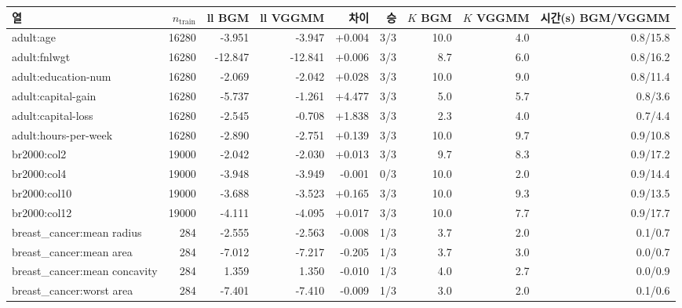 \begin{tabular}{lrrrrrrrr}
\toprule
열 & $n_{\mathrm{train}}$ & ll BGM & ll VGGMM & 차이 & 승 & $K$ BGM & $K$ VGGMM & 시간(s) BGM/VGGMM \\
\midrule
adult:age & 16280 & -3.951 & -3.947 & +0.004 & 3/3 & 10.0 & 4.0 & 0.8/15.8 \\
adult:fnlwgt & 16280 & -12.847 & -12.841 & +0.006 & 3/3 & 8.7 & 6.0 & 0.8/16.2 \\
adult:education-num & 16280 & -2.069 & -2.042 & +0.028 & 3/3 & 10.0 & 9.0 & 0.8/11.4 \\
adult:capital-gain & 16280 & -5.737 & -1.261 & +4.477 & 3/3 & 5.0 & 5.7 & 0.8/3.6 \\
adult:capital-loss & 16280 & -2.545 & -0.708 & +1.838 & 3/3 & 2.3 & 4.0 & 0.7/4.4 \\
adult:hours-per-week & 16280 & -2.890 & -2.751 & +0.139 & 3/3 & 10.0 & 9.7 & 0.9/10.8 \\
br2000:col2 & 19000 & -2.042 & -2.030 & +0.013 & 3/3 & 9.7 & 8.3 & 0.9/17.2 \\
br2000:col4 & 19000 & -3.948 & -3.949 & -0.001 & 0/3 & 10.0 & 2.0 & 0.9/14.4 \\
br2000:col10 & 19000 & -3.688 & -3.523 & +0.165 & 3/3 & 10.0 & 9.3 & 0.9/13.5 \\
br2000:col12 & 19000 & -4.111 & -4.095 & +0.017 & 3/3 & 10.0 & 7.7 & 0.9/17.7 \\
breast\_cancer:mean radius & 284 & -2.555 & -2.563 & -0.008 & 1/3 & 3.7 & 2.0 & 0.1/0.7 \\
breast\_cancer:mean area & 284 & -7.012 & -7.217 & -0.205 & 1/3 & 3.7 & 3.0 & 0.0/0.7 \\
breast\_cancer:mean concavity & 284 & 1.359 & 1.350 & -0.010 & 1/3 & 4.0 & 2.7 & 0.0/0.9 \\
breast\_cancer:worst area & 284 & -7.401 & -7.410 & -0.009 & 1/3 & 3.0 & 2.0 & 0.1/0.6 \\
\bottomrule
\end{tabular}